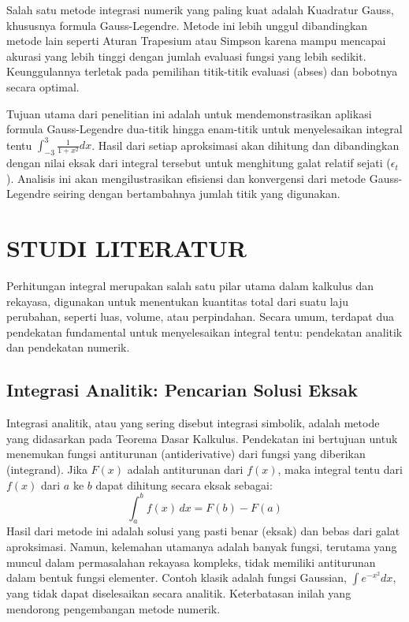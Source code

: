 \documentclass[conference]{IEEEtran}
\begin{document}
Salah satu metode integrasi numerik yang paling kuat adalah Kuadratur Gauss, khususnya formula Gauss-Legendre. Metode ini lebih unggul dibandingkan metode lain seperti Aturan Trapesium atau Simpson karena mampu mencapai akurasi yang lebih tinggi dengan jumlah evaluasi fungsi yang lebih sedikit. Keunggulannya terletak pada pemilihan titik-titik evaluasi (abses) dan bobotnya secara optimal.

Tujuan utama dari penelitian ini adalah untuk mendemonstrasikan aplikasi formula Gauss-Legendre dua-titik hingga enam-titik untuk menyelesaikan integral tentu $\int_{-3}^{3} \frac{1}{1+x^2} dx$. Hasil dari setiap aproksimasi akan dihitung dan dibandingkan dengan nilai eksak dari integral tersebut untuk menghitung galat relatif sejati ($\epsilon_t$). Analisis ini akan mengilustrasikan efisiensi dan konvergensi dari metode Gauss-Legendre seiring dengan bertambahnya jumlah titik yang digunakan.

\section{STUDI LITERATUR}

Perhitungan integral merupakan salah satu pilar utama dalam kalkulus dan rekayasa, digunakan untuk menentukan kuantitas total dari suatu laju perubahan, seperti luas, volume, atau perpindahan. Secara umum, terdapat dua pendekatan fundamental untuk menyelesaikan integral tentu: pendekatan analitik dan pendekatan numerik.

\subsection{Integrasi Analitik: Pencarian Solusi Eksak}
Integrasi analitik, atau yang sering disebut integrasi simbolik, adalah metode yang didasarkan pada Teorema Dasar Kalkulus. Pendekatan ini bertujuan untuk menemukan fungsi antiturunan (antiderivative) dari fungsi yang diberikan (integrand). Jika $F(x)$ adalah antiturunan dari $f(x)$, maka integral tentu dari $f(x)$ dari $a$ ke $b$ dapat dihitung secara eksak sebagai:
\begin{equation}
    \int_{a}^{b} f(x) \,dx = F(b) - F(a)
\end{equation}
Hasil dari metode ini adalah solusi yang pasti benar (eksak) dan bebas dari galat aproksimasi. Namun, kelemahan utamanya adalah banyak fungsi, terutama yang muncul dalam permasalahan rekayasa kompleks, tidak memiliki antiturunan dalam bentuk fungsi elementer. Contoh klasik adalah fungsi Gaussian, $\int e^{-x^2} dx$, yang tidak dapat diselesaikan secara analitik. Keterbatasan inilah yang mendorong pengembangan metode numerik.
\end{document}
